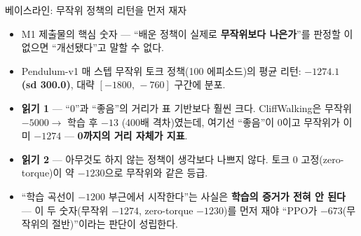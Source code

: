 \documentclass[aspectratio=169,11pt]{beamer}
\begin{document}

\begin{frame}{베이스라인: 무작위 정책의 리턴을 먼저 재자}
  \begin{itemize}
    \item M1 제출물의 핵심 숫자 — ``배운 정책이 실제로 \textbf{무작위보다
      나은가}''를 판정할 이 없으면 ``개선됐다''고 말할 수 없다.
    \item Pendulum-v1 매 스텝 무작위 토크 정책(100 에피소드)의 평균 리턴:
      \textbf{$-1274.1$ (sd 300.0)}, 대략 $[-1800,\,-760]$ 구간에 분포.
    \item \textbf{읽기 1} — ``0''과 ``좋음''의 거리가 표 기반보다 훨씬 크다.
      CliffWalking은 무작위 $-5000 \to$ 학습 후 $-13$ (400배 격차)였는데,
      여기선 ``좋음''이 0이고 무작위가 이미 $-1274$ — \textbf{0까지의 거리
      자체가 지표}.
    \item \textbf{읽기 2} — 아무것도 하지 않는 정책이 생각보다 나쁘지 않다.
      토크 0 고정(zero-torque)이 약 \textbf{$-1230$}으로 무작위와 같은 등급.
    \item ``학습 곡선이 $-1200$ 부근에서 시작한다''는 사실은 \textbf{학습의
      증거가 전혀 안 된다} — 이 두 숫자(무작위 $-1274$, zero-torque $-1230$)를
      먼저 재야 ``PPO가 $-673$(무작위의 절반)''이라는 판단이 성립한다.
  \end{itemize}
\end{frame}
\end{document}
